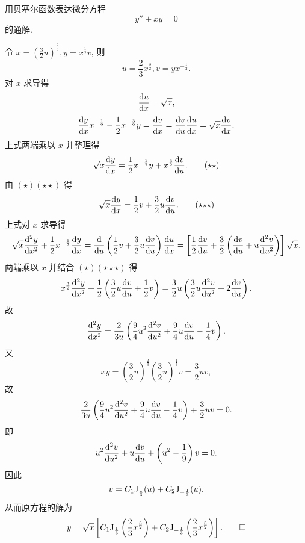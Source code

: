 \begin{exercise}
  用贝塞尔函数表达微分方程
  \[y''+xy=0\]
  的通解.
\end{exercise}

\begin{solution} 
  令 $x=\left(\frac{3}{2}u\right)^{\frac{2}{3}},y=x^{\frac{1}{2}}v$, 则
  \begin{equation}
    u=\frac{2}{3}x^{\frac{3}{2}},v=yx^{-\frac{1}{2}}. \tag{$\star$}
  \end{equation}
  对 $x$ 求导得
  \[\frac{\mathop{}\!\mathrm{d} u}{\mathop{}\!\mathrm{d} x}=\sqrt{x},\]
  \[\frac{\diff y}{\diff x}x^{-\frac{1}{2}}-\frac{1}{2}x^{-\frac{3}{2}}y
    = \frac{\diff v}{\diff x}=\frac{\diff v}{\diff u}\frac{\diff u}{\diff x}
    = \sqrt{x}\frac{\diff v}{\diff x}.\]
  上式两端乘以 $x$ 并整理得
  \begin{equation}
    \sqrt{x}\frac{\mathop{}\!\mathrm{d} y}{\mathop{}\!\mathrm{d} x}
      = \frac{1}{2}x^{-\frac{1}{2}}y+x^{\frac{3}{2}}\frac{\mathop{}\!\mathrm{d} v}{\mathop{}\!\mathrm{d} u}.
    \tag{$\star\star$}
  \end{equation}
  由 $(\star)(\star\star)$ 得
  \begin{equation}
    \sqrt{x}\frac{\diff y}{\diff x}=\frac{1}{2}v+\frac{3}{2}u\frac{\diff v}{\diff u}.
    \tag{$\star{\star}\star$}
  \end{equation}
  上式对 $x$ 求导得
  \[\sqrt{x}\frac{\diff^2y}{\diff x^2}+\frac{1}{2}x^{-\frac{1}{2}}\frac{\diff y}{\diff x}
    = \frac{\diff}{\diff u}\left(\frac{1}{2}v+\frac{3}{2}u\frac{\diff v}{\diff u}\right)\frac{\diff u}{\diff x}
    = \left[\frac{1}{2}\frac{\diff v}{\diff u}+\frac{3}{2}\left(\frac{\diff v}{\diff u}+u\frac{\diff^2v}{\diff u^2}\right)\right]\sqrt{x}.\]
  两端乘以 $x$ 并结合 $(\star)(\star{\star}\star)$ 得
  \[x^{\frac{3}{2}}\frac{\diff^2y}{\diff x^2}
    + \frac{1}{2}\left(\frac{3}{2}u\frac{\diff v}{\diff u}
    + \frac{1}{2}v\right)
    = \frac{3}{2}u\left(\frac{3}{2}u\frac{\diff^2v}{\diff u^2}+2\frac{\diff v}{\diff u}\right).\]
  故
  \[\frac{\mathop{}\!\mathrm{d}^2y}{\mathop{}\!\mathrm{d} x^2}=\frac{2}{3u}\left(\frac{9}{4}u^2\frac{\mathop{}\!\mathrm{d}^2v}{\mathop{}\!\mathrm{d} u^2}+\frac{9}{4}u\frac{\mathop{}\!\mathrm{d} v}{\mathop{}\!\mathrm{d} u}-\frac{1}{4}v\right).\]
  又
  \[xy=\left(\frac{3}{2}u\right)^{\frac{2}{3}}\left(\frac{3}{2}u\right)^{\frac{1}{3}}v=\frac{3}{2}uv,\]
  故
  \[\frac{2}{3u}\left(\frac{9}{4}u^2\frac{\mathop{}\!\mathrm{d}^2v}{\mathop{}\!\mathrm{d} u^2}+\frac{9}{4}u\frac{\mathop{}\!\mathrm{d} v}{\mathop{}\!\mathrm{d} u}-\frac{1}{4}v\right)+\frac{3}{2}uv=0.\]
  即
  \[u^2\frac{\mathop{}\!\mathrm{d}^2v}{\mathop{}\!\mathrm{d} u^2}+u\frac{\mathop{}\!\mathrm{d} v}{\mathop{}\!\mathrm{d} u}+\left(u^2-\frac{1}{9}\right)v=0.\]
  因此
  \[v=C_1\mathrm{J}_{\frac{1}{3}}(u)+C_2\mathrm{J}_{-\frac{1}{3}}(u).\]
  从而原方程的解为
  \[y=\sqrt{x}\left[C_1\mathrm{J}_{\frac{1}{3}}\left(\frac{2}{3}x^{\frac{3}{2}}\right)+C_2\mathrm{J}_{-\frac{1}{3}}\left(\frac{2}{3}x^{\frac{3}{2}}\right)\right].\qedhere\]
\end{solution}